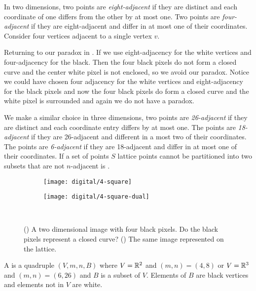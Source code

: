 In two dimensions, two points are \emph{eight-adjacent}
if they are distinct and each coordinate of one differs from
the other by at most one.
Two points are \emph{four-adjacent} if
they are eight-adjacent and differ in at most one of their coordinates.
Consider four vertices adjacent to a single vertex $v$.

Returning to our paradox in .
If we use eight-adjacency
for the white vertices and four-adjacency for the black.
Then the four black pixels do not form a closed curve 
and the center white pixel is not enclosed, so we avoid our paradox. 
Notice we could have chosen four adjacency
for the white vertices and eight-adjacency for the black pixels and 
now the four black pixels do form a closed curve and the white pixel
is surrounded and again we do not have a paradox.



We make a similar choice in three dimensions, two points
are \emph{26-adjacent} if they are distinct and each coordinate 
entry differs by at most one.
The points are \emph{18-adjacent} if they are 26-adjacent
and different in  a most two of their coordinates.
The points are \emph{6-adjacent} if they are 18-adjacent and differ 
in at most one of their coordinates.
If a set of points $S$ lattice points cannot be
partitioned into two subsets that are not
$n$-adjacent is .



\begin{figure}[htb]
        \centering
        \begin{subfigure}[b]{0.25\textwidth}
        \texttt{[image: digital/4-square]}
        \caption{}
          \label{fig:4-square}
        \end{subfigure}
          \hspace{.3cm}
         \begin{subfigure}[b]{0.25\textwidth}
        \texttt{[image: digital/4-square-dual]}
        \caption{}
        \label{fig:4-square-dual}
        \end{subfigure}\\
		\caption{() A two dimensional image with four black pixels.
		Do the black pixels represent a closed curve? () The same image
		represented on the lattice.
		\label{fig:4-square-and-dual}}
\end{figure}

A  is a quadruple $(V,m,n,B)$ where
$V=\mathbb{R}^2$ and $(m,n)=(4,8)$ or $V=\mathbb{R}^3$ and $(m,n)=(6,26)$
and $B$ is a subset of $V$. Elements of $B$ are black vertices
and elements not in $V$ are white.

